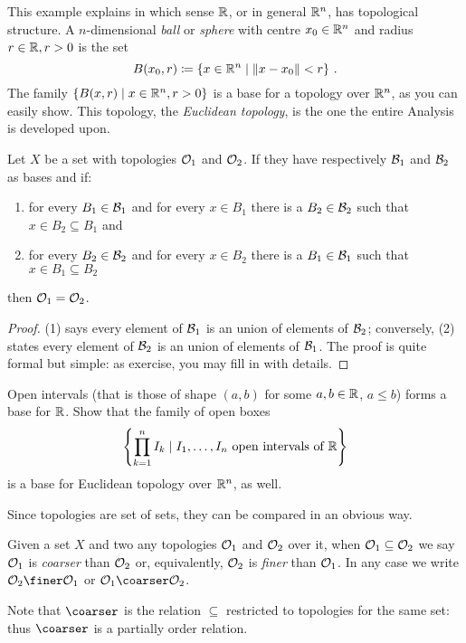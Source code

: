 \begin{example}
This example explains in which sense \(\mathbb R\), or in general \(\mathbb R^n\), has topological structure. A \(n\)-dimensional {\em ball} or {\em sphere} with centre \(x_0 \in \mathbb R^n\) and radius \(r \in \mathbb R, r>0\) is the set
\[B(x_0, r) \coloneq \left\{x \in \mathbb R^n \mid \lVert x-x_0\rVert < r\right\}\,.\]
The family \(\left\{B(x, r) \mid x \in \mathbb R^n, r>0\right\}\) is a base for a topology over \(\mathbb R^n\), as you can easily show. This topology, the {\em Euclidean topology}, is the one the entire Analysis is developed upon.
\end{example}

\begin{theorem}
Let \(X\) be a set with topologies \(\mathcal O_1\) and \(\mathcal O_2\). If they have respectively \(\mathcal B_1\) and \(\mathcal B_2\) as bases and if:
\begin{enumerate}
\item for every \(B_1 \in \mathcal B_1\) and for every \(x \in B_1\) there is a \(B_2 \in \mathcal B_2\) such that \(x \in B_2 \subseteq B_1\) and
\item for every \(B_2 \in \mathcal B_2\) and for every \(x \in B_2\) there is a \(B_1 \in \mathcal B_1\) such that \(x \in B_1 \subseteq B_2\)
\end{enumerate}
then \(\mathcal O_1 = \mathcal O_2\).
\end{theorem}

\begin{proof}
(1) says every element of \(\mathcal B_1\) is an union of elements of \(\mathcal B_2\); conversely, (2) states every element of \(\mathcal B_2\) is an union of elements of \(\mathcal B_1\). The proof is quite formal but simple: as exercise, you may fill in with details.
\end{proof}

\begin{exercise}
Open intervals (that is those of shape \((a, b)\) for some \(a, b \in \mathbb R\), \(a \le b\)) forms a base for \(\mathbb R\). Show that the family of open boxes
\[\left\{\prod_{k=1}^n I_k \mid I_1, \dots{}, I_n \text{ open intervals of } \mathbb R\right\}\]
is a base for Euclidean topology over \(\mathbb R^n\), as well.
\end{exercise}

Since topologies are set of sets, they can be compared in an obvious way.

\begin{definition}
Given a set \(X\) and two any topologies \(\mathcal O_1\) and \(\mathcal O_2\) over it, when \(\mathcal O_1 \subseteq \mathcal O_2\) we say \(\mathcal O_1\) is {\em coarser} than \(\mathcal O_2\) or, equivalently, \(\mathcal O_2\) is {\em finer} than \(\mathcal O_1\). In any case we write \(\calO_2 \finer \calO_1\) or \(\calO_1 \coarser \calO_2\).
\end{definition}

Note that \(\coarser\) is the relation \(\subseteq\) restricted to topologies for the same set: thus \(\coarser\) is a partially order relation.